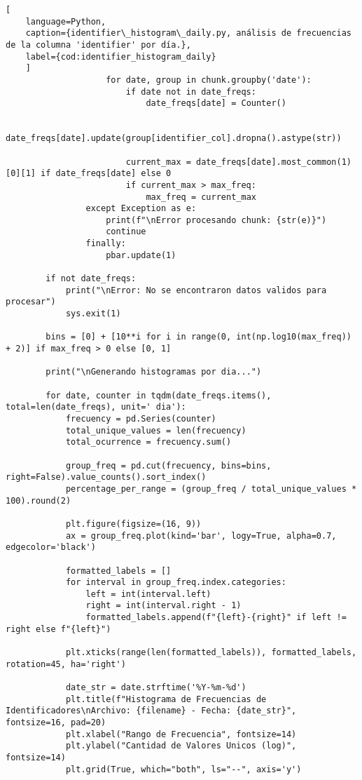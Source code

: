 \begin{lstlisting}[
    language=Python,
    caption={identifier\_histogram\_daily.py, análisis de frecuencias de la columna 'identifier' por día.},
    label={cod:identifier_histogram_daily}
    ]
                    for date, group in chunk.groupby('date'):
                        if date not in date_freqs:
                            date_freqs[date] = Counter()
                        
                        date_freqs[date].update(group[identifier_col].dropna().astype(str))
                        
                        current_max = date_freqs[date].most_common(1)[0][1] if date_freqs[date] else 0
                        if current_max > max_freq:
                            max_freq = current_max
                except Exception as e:
                    print(f"\nError procesando chunk: {str(e)}")
                    continue
                finally:
                    pbar.update(1)

        if not date_freqs:
            print("\nError: No se encontraron datos validos para procesar")
            sys.exit(1)

        bins = [0] + [10**i for i in range(0, int(np.log10(max_freq)) + 2)] if max_freq > 0 else [0, 1]
        
        print("\nGenerando histogramas por dia...")
        
        for date, counter in tqdm(date_freqs.items(), total=len(date_freqs), unit=' dia'):
            frecuency = pd.Series(counter)
            total_unique_values = len(frecuency)
            total_ocurrence = frecuency.sum()
            
            group_freq = pd.cut(frecuency, bins=bins, right=False).value_counts().sort_index()
            percentage_per_range = (group_freq / total_unique_values * 100).round(2)
            
            plt.figure(figsize=(16, 9))
            ax = group_freq.plot(kind='bar', logy=True, alpha=0.7, edgecolor='black')
            
            formatted_labels = []
            for interval in group_freq.index.categories:
                left = int(interval.left)
                right = int(interval.right - 1)
                formatted_labels.append(f"{left}-{right}" if left != right else f"{left}")
            
            plt.xticks(range(len(formatted_labels)), formatted_labels, rotation=45, ha='right')
            
            date_str = date.strftime('%Y-%m-%d')
            plt.title(f"Histograma de Frecuencias de Identificadores\nArchivo: {filename} - Fecha: {date_str}", fontsize=16, pad=20)
            plt.xlabel("Rango de Frecuencia", fontsize=14)
            plt.ylabel("Cantidad de Valores Unicos (log)", fontsize=14)
            plt.grid(True, which="both", ls="--", axis='y')
            

\end{lstlisting}
